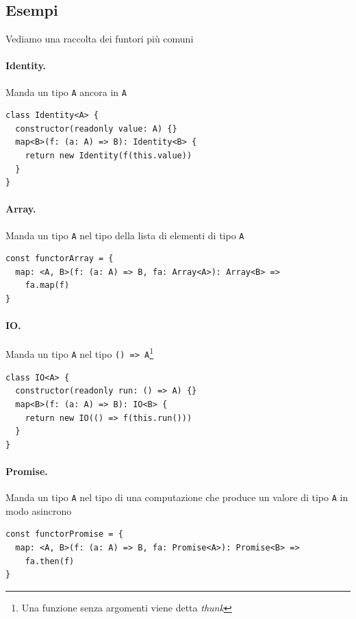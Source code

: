 \documentclass[12pt]{article}
\begin{document}
\subsection{Esempi}

Vediamo una raccolta dei funtori più comuni

\paragraph{Identity.}

Manda un tipo \texttt{A} ancora in \texttt{A}

\begin{verbatim}
class Identity<A> {
  constructor(readonly value: A) {}
  map<B>(f: (a: A) => B): Identity<B> {
    return new Identity(f(this.value))
  }
}
\end{verbatim}

\paragraph{Array.}

Manda un tipo \texttt{A} nel tipo della lista di elementi di tipo \texttt{A}

\begin{verbatim}
const functorArray = {
  map: <A, B>(f: (a: A) => B, fa: Array<A>): Array<B> =>
    fa.map(f)
}
\end{verbatim}

\paragraph{IO.}

Manda un tipo \texttt{A} nel tipo \texttt{() => A}\footnote{Una funzione senza argomenti viene detta \emph{thunk}}

\begin{verbatim}
class IO<A> {
  constructor(readonly run: () => A) {}
  map<B>(f: (a: A) => B): IO<B> {
    return new IO(() => f(this.run()))
  }
}
\end{verbatim}

\paragraph{Promise.}

Manda un tipo \texttt{A} nel tipo di una computazione che produce un valore di tipo \texttt{A} in modo asincrono

\begin{verbatim}
const functorPromise = {
  map: <A, B>(f: (a: A) => B, fa: Promise<A>): Promise<B> =>
    fa.then(f)
}
\end{verbatim}
\end{document}
